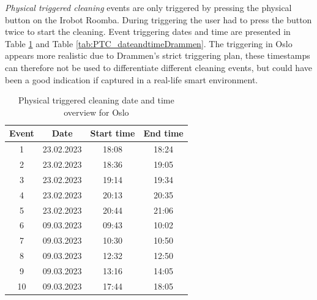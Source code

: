 \textit{Physical triggered cleaning} events are only triggered by pressing the physical button on the Irobot Roomba. During triggering the user had to press the button twice to start the cleaning. Event triggering dates and time are presented in Table \ref{tab:PTC_dateandtimeOslo} and Table \ref{tab:PTC_dateandtimeDrammen}. The triggering in Oslo appears more realistic due to Drammen's strict triggering plan, these timestamps can therefore not be used to differentiate different cleaning events, but could have been a good indication if captured in a real-life smart environment. 

\begin{table}[H]
\centering
\caption{Physical triggered cleaning date and time overview for Oslo}
\label{tab:PTC_dateandtimeOslo}
\begin{tabular}{|c|c|c|c|}
\hline
\textbf{Event} & \textbf{Date} & \textbf{Start time} & \textbf{End time} \\ \hline
1              & 23.02.2023         & 18:08               & 18:24             \\ \hline
2              & 23.02.2023         & 18:36               & 19:05             \\ \hline
3              & 23.02.2023         & 19:14               & 19:34             \\ \hline
4              & 23.02.2023         & 20:13               & 20:35             \\ \hline
5              & 23.02.2023         & 20:44               & 21:06             \\ \hline
6              & 09.03.2023         & 09:43               & 10:02             \\ \hline
7              & 09.03.2023         & 10:30               & 10:50             \\ \hline
8              & 09.03.2023         & 12:32               & 12:50             \\ \hline
9              & 09.03.2023         & 13:16               & 14:05             \\ \hline
10             & 09.03.2023         & 17:44               & 18:05             \\ \hline
\end{tabular}
\end{table}

